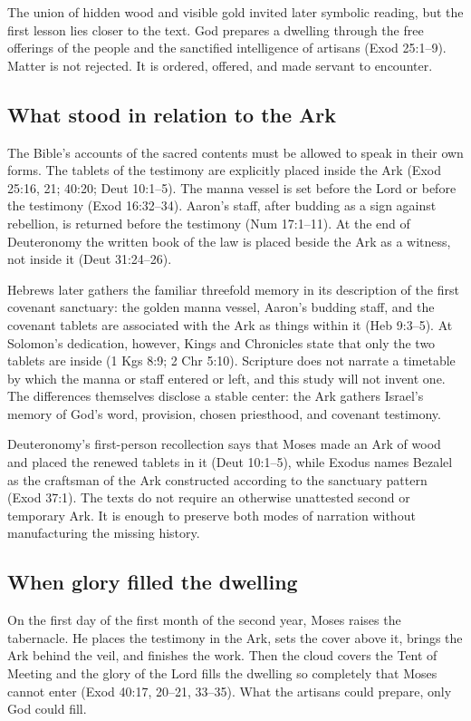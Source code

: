 The union of hidden wood and visible gold invited later symbolic reading, but
the first lesson lies closer to the text.  God prepares a dwelling through the
free offerings of the people and the sanctified intelligence of artisans
(Exod 25:1--9).  Matter is not rejected.  It is ordered, offered, and made
servant to encounter.

\subsection{What stood in relation to the Ark}

The Bible's accounts of the sacred contents must be allowed to speak in their
own forms.  The tablets of the testimony are explicitly placed inside the Ark
(Exod 25:16, 21; 40:20; Deut 10:1--5).  The manna vessel is set before the
Lord or before the testimony (Exod 16:32--34).  Aaron's staff, after budding as
a sign against rebellion, is returned before the testimony (Num 17:1--11).
At the end of Deuteronomy the written book of the law is placed beside the Ark
as a witness, not inside it (Deut 31:24--26).

Hebrews later gathers the familiar threefold memory in its description of the
first covenant sanctuary: the golden manna vessel, Aaron's budding staff, and
the covenant tablets are associated with the Ark as things within it
(Heb 9:3--5).  At Solomon's dedication, however, Kings and Chronicles state
that only the two tablets are inside (1 Kgs 8:9; 2 Chr 5:10).  Scripture does
not narrate a timetable by which the manna or staff entered or left, and this
study will not invent one.  The differences themselves disclose a stable
center: the Ark gathers Israel's memory of God's word, provision, chosen
priesthood, and covenant testimony.

Deuteronomy's first-person recollection says that Moses made an Ark of wood and
placed the renewed tablets in it (Deut 10:1--5), while Exodus names Bezalel as
the craftsman of the Ark constructed according to the sanctuary pattern
(Exod 37:1).  The texts do not require an otherwise unattested second or
temporary Ark.  It is enough to preserve both modes of narration without
manufacturing the missing history.

\subsection{When glory filled the dwelling}

On the first day of the first month of the second year, Moses raises the
tabernacle.  He places the testimony in the Ark, sets the cover above it,
brings the Ark behind the veil, and finishes the work.  Then the cloud covers
the Tent of Meeting and the glory of the Lord fills the dwelling so completely
that Moses cannot enter (Exod 40:17, 20--21, 33--35).  What the artisans could
prepare, only God could fill.

